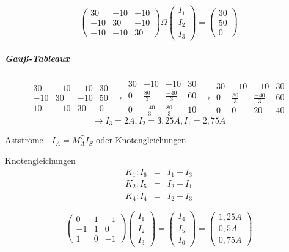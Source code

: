 \documentclass[german]{article}
\newcommand{\ohm}{\Omega}
\begin{document}
\[
	\begin{pmatrix}
		30 & -10 & -10 \\
		-10 & 30 & -10 \\
		-10 & -10 & 30
	\end{pmatrix} \ohm
	\begin{pmatrix}
		I_1 \\
		I_2 \\
		I_3
	\end{pmatrix}
	=
	\begin{pmatrix}
		30 \\
		50 \\
		0
	\end{pmatrix}
\]

\subparagraph{Gauß-Tableaux}
\[
	\begin{array}{ccc|c}
		30 & -10 & -10 & 30 \\
		-10 & 30 & -10 & 50 \\
		10 & -10 & 30 & 0
	\end{array}
	\rightarrow
	\begin{array}{ccc|c}
		30 & -10 & -10 & 30 \\
		0 & \frac{80}{3} & \frac{-40}{3} & 60 \\
		0 & \frac{-40}{3} & \frac{80}{3} & 10
	\end{array}
	\rightarrow
	\begin{array}{ccc|c}
		30 & -10 & -10 & 30 \\
		0 & \frac{80}{3} & \frac{-40}{3} & 60 \\
		0 & 0 & 20 & 40
	\end{array}
\]
\[
	\rightarrow I_3 = 2A, I_2 = 3,25A, I_1 = 2,75A
\]

Astströme - $I_A = M_A^T I_S$ oder Knotengleichungen

Knotengleichungen
\begin{eqnarray*}
	K_1: I_6 & = & I_1 - I_3 \\
	K_2: I_5 & = & I_2 - I_1 \\
	K_4: I_4 & = & I_2 - I_3
\end{eqnarray*}

\[
	\begin{pmatrix}
		0 & 1 & -1 \\
		-1 & 1 & 0 \\
		1 & 0 & -1
	\end{pmatrix}
	\begin{pmatrix}
		I_1 \\
		I_2 \\
		I_3
	\end{pmatrix}
	=
	\begin{pmatrix}
		I_4 \\
		I_5 \\
		I_6
	\end{pmatrix}
	=
	\begin{pmatrix}
		1,25 A \\
		0,5 A \\
		0,75 A
	\end{pmatrix}
\]
\end{document}
